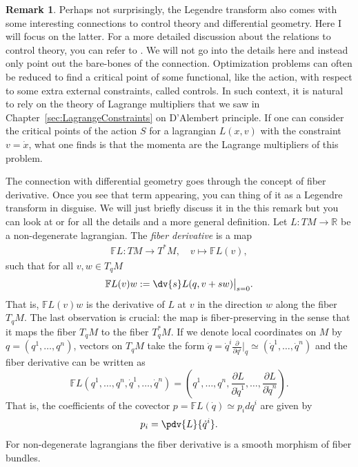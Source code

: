 \documentclass[english,fontsize=11pt,paper=b5]{scrbook}
\theoremstyle{definition}
\newtheorem{remark}{Remark}[chapter]
\begin{document}
    \begin{remark}
      Perhaps not surprisingly, the Legendre transform also comes with some interesting connections to control theory and differential geometry.
      Here I will focus on the latter. For a more detailed discussion about the relations to control theory, you can refer to \cite[Appendix II]{book:gelfand}.
      We will not go into the details here and instead only point out the bare-bones of the connection.
      Optimization problems can often be reduced to find a critical point of some functional, like the action, with respect to some extra external constraints, called controls.
      In such context, it is natural to rely on the theory of Lagrange multipliers that we saw in Chapter~\ref{sec:LagrangeConstraints} on D'Alembert principle.
      If one can consider the critical points of the action $S$ for a lagrangian $L(x,v)$ with the constraint $v=\dot x$, what one finds is that the momenta are the Lagrange multipliers of this problem.

      The connection with differential geometry goes through the concept of fiber derivative. Once you see that term appearing, you can thing of it as a Legendre transform in disguise. We will just briefly discuss it in the this remark but you can look at \cite[Chapter 7.2]{book:marsdenratiu} or \cite[Chapter 3.5]{book:amr} for all the details and a more general definition.
      Let $L:TM \to \mathbb{R}$ be a non-degenerate lagrangian. The \emph{fiber derivative} is a map
      \begin{align}
        \mathbb{F}L : TM \to T^*M, \quad v \mapsto \mathbb{F}L(v),
      \end{align}
      such that for all $v,w \in T_q M$
      \begin{align}
        \mathbb{F}L(v) w := \dv{s} L(q, v + s w) \big|_{s=0}.
      \end{align}
      That is, $\mathbb{F}L(v) w$ is the derivative of $L$ at $v$ in the direction $w$ along the fiber $T_qM$.
      The last observation is crucial: the map is fiber-preserving in the sense that it maps the fiber $T_qM$ to the fiber $T^*_qM$.
      If we denote local coordinates on $M$ by $q=(q^1, \ldots, q^n)$, vectors on $T_qM$ take the form $\dot q = \dot q^i \frac{\partial}{\partial q^i}\big|_q \simeq (\dot q^1, \ldots, \dot q^n)$ and the fiber derivative can be written as
      \begin{equation}
        \mathbb{F}L(q^1, \ldots, q^n, \dot q^1, \ldots,\dot q^n) = \left(q^1, \ldots, q^n, \frac{\partial L}{\partial \dot q^1}, \ldots, \frac{\partial L}{\partial \dot q^n}\right).
      \end{equation}
      That is, the coefficients of the covector $p = \mathbb{F}L(\dot q) \simeq p_i dq^i$ are given by
      \begin{equation}
        p_i = \pdv{L}{\dot q^i}.
      \end{equation}
      For non-degenerate lagrangians the fiber derivative is a smooth morphism of fiber bundles.


\end{remark}
\end{document}
